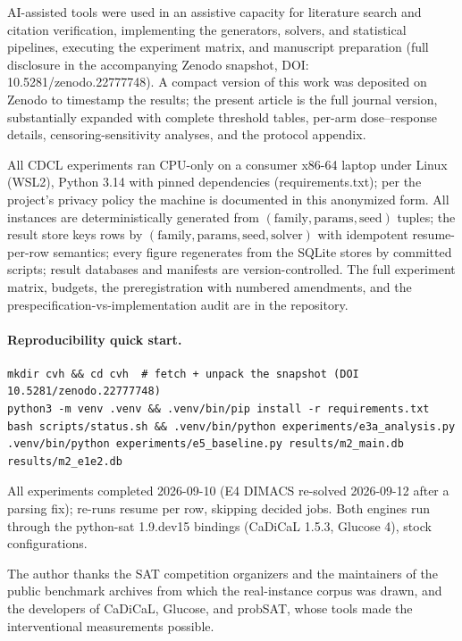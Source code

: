 \documentclass[manuscript, screen, review]{jair}
\begin{document}
AI-assisted tools were used in an assistive capacity for literature search
and citation verification, implementing the generators, solvers, and
statistical pipelines, executing the experiment matrix, and manuscript
preparation (full disclosure in the accompanying Zenodo snapshot, DOI:
10.5281/zenodo.22777748).
A compact version of this work was deposited on Zenodo to timestamp the
results; the present article is the full journal version, substantially
expanded with complete threshold tables, per-arm dose--response details,
censoring-sensitivity analyses, and the protocol appendix.

All CDCL experiments ran CPU-only on a consumer x86-64 laptop under Linux
(WSL2), Python 3.14 with pinned dependencies (requirements.txt); per the
project's privacy policy the machine is documented in this anonymized form.
All instances are deterministically generated from
$(\text{family}, \text{params}, \text{seed})$ tuples; the result store keys
rows by $(\text{family}, \text{params}, \text{seed}, \text{solver})$ with
idempotent resume-per-row semantics; every figure regenerates from the SQLite
stores by committed scripts; result databases and manifests are
version-controlled. The full experiment matrix, budgets, the preregistration
with numbered amendments, and the prespecification-vs-implementation audit are
in the repository.

\paragraph{Reproducibility quick start.}
\begin{verbatim}
mkdir cvh && cd cvh  # fetch + unpack the snapshot (DOI 10.5281/zenodo.22777748)
python3 -m venv .venv && .venv/bin/pip install -r requirements.txt
bash scripts/status.sh && .venv/bin/python experiments/e3a_analysis.py
.venv/bin/python experiments/e5_baseline.py results/m2_main.db results/m2_e1e2.db
\end{verbatim}
All experiments completed 2026-09-10 (E4 DIMACS re-solved 2026-09-12 after a
parsing fix); re-runs resume per row, skipping decided jobs. Both engines run
through the python-sat 1.9.dev15 bindings (CaDiCaL 1.5.3, Glucose 4), stock
configurations.

\begin{acks}
The author thanks the SAT competition organizers and the maintainers of the
public benchmark archives from which the real-instance corpus was drawn, and
the developers of CaDiCaL, Glucose, and probSAT, whose tools made the
interventional measurements possible.
\end{acks}
\end{document}
